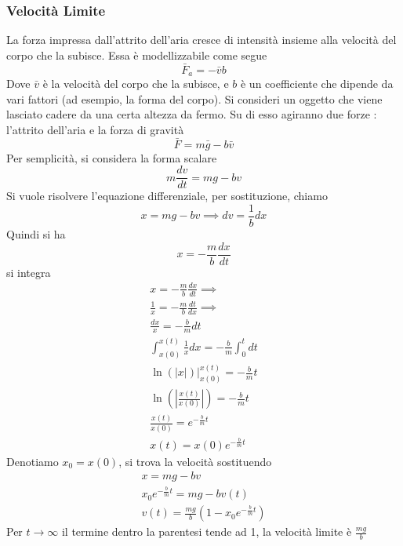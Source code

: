 \documentclass[10pt, letterpaper]{report}
\begin{document}
\subsubsection{Velocità Limite}
La forza impressa dall'attrito dell'aria cresce di intensità insieme alla velocità del corpo che la subisce. Essa 
è modellizzabile come segue $$ \bar F_a=-\bar vb$$
Dove $\bar v$ è la velocità del corpo che la subisce, e $b$ è un coefficiente che dipende da vari fattori (ad esempio, 
la forma del corpo). Si consideri un oggetto che viene lasciato cadere da una certa altezza da fermo. Su di esso 
agiranno due forze : l'attrito dell'aria e la forza di gravità 
$$ \bar F = m\bar g - b\bar v$$
Per semplicità, si considera la forma scalare 
$$ m\frac{dv}{dt}=mg-bv$$
Si vuole risolvere l'equazione differenziale, per sostituzione, chiamo 
$$ x=mg-bv \implies dv=\frac{1}{b}dx$$
Quindi si ha $$ x=-\frac{m}{b}\frac{dx}{dt}$$ si integra 
\begin{eqnarray}
    x=-\frac{m}{b}\frac{dx}{dt}\implies \\ 
    \frac{1}{x}=-\frac{m}{b}\frac{dt}{dx}\implies \\ 
    \frac{dx}{x}=-\frac{b}{m}dt\\
    \int_{x(0)}^{x(t)}\frac{1}{x}dx=-\frac{b}{m}\int_0^t dt\\ 
    \ln(|x|)\Big |_{x(0)}^{x(t)}=-\frac{b}{m}t\\ 
    \ln(|\frac{x(t)}{x(0)}|)=-\frac{b}{m}t\\ 
    \frac{x(t)}{x(0)}=e^{-\frac{b}{m}t}\\ 
    x(t)=x(0)e^{-\frac{b}{m}t}
\end{eqnarray}
Denotiamo $x_0=x(0)$, si trova la velocità sostituendo
\begin{eqnarray}
    x=mg-bv\\ 
    x_0e^{-\frac{b}{m}t}=mg-bv(t)\\ 
    v(t)=\frac{mg}{b}(1-x_0e^{-\frac{b}{m}t})
\end{eqnarray}
Per $t\rightarrow \infty$ il termine dentro la parentesi tende ad 1, la velocità limite è $\frac{mg}{b}$\begin{center}
\end{center}
\flowerLine 
\end{document}
